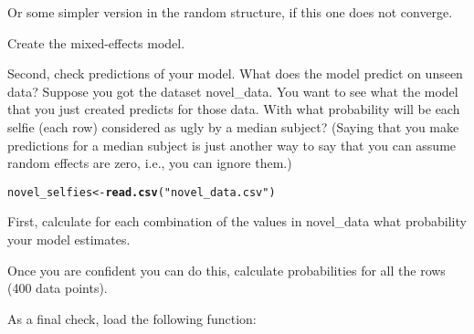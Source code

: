\documentclass{article}\usepackage[]{graphicx}\usepackage[]{color}
\makeatletter
\newcommand{\hlstr}[1]{\textcolor[rgb]{0.192,0.494,0.8}{#1}}%
\newcommand{\hlstd}[1]{\textcolor[rgb]{0.345,0.345,0.345}{#1}}%
\newcommand{\hlkwb}[1]{\textcolor[rgb]{0.69,0.353,0.396}{#1}}%
\newcommand{\hlkwd}[1]{\textcolor[rgb]{0.737,0.353,0.396}{\textbf{#1}}}%
\newenvironment{kframe}{%
 \def\at@end@of@kframe{}%
 \ifinner\ifhmode%
  \def\at@end@of@kframe{\end{minipage}}%
  \begin{minipage}{\columnwidth}%
 \fi\fi%
 \def\FrameCommand##1{\hskip\@totalleftmargin \hskip-\fboxsep
 \colorbox{shadecolor}{##1}\hskip-\fboxsep
     \hskip-\linewidth \hskip-\@totalleftmargin \hskip\columnwidth}%
 \MakeFramed {\advance\hsize-\width
   \@totalleftmargin\z@ \linewidth\hsize
   \@setminipage}}%
 {\par\unskip\endMakeFramed%
 \at@end@of@kframe}
\newenvironment{knitrout}{}{} %
\makeatother
\begin{document}
Or some simpler version in the random structure, if this one does not converge.

Create the mixed-effects model.

Second, check predictions of your model. What does the model predict on unseen data? Suppose you got the dataset novel\_data. You want to see what the model that you just created predicts for those data. With what probability will be each selfie (each row) considered as ugly by a median subject? (Saying that you make predictions for a median subject is just another way to say that you can assume random effects are zero, i.e., you can ignore them.)

\begin{knitrout}
\color{fgcolor}\begin{kframe}
\begin{alltt}
\hlstd{novel_selfies} \hlkwb{<-} \hlkwd{read.csv}\hlstd{(}\hlstr{"novel_data.csv"}\hlstd{)}
\end{alltt}
\end{kframe}
\end{knitrout}

First, calculate for each combination of the values in novel\_data what probability your model estimates.

Once you are confident you can do this, calculate probabilities for all the rows (400 data points).

As a final check, load the following function:
\end{document}
